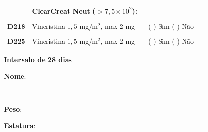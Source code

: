\documentclass[11pt,a4paper,oldfontcommands]{memoir}
\def\entrywithlabel[#1]#2{\parbox{#1}{{\small #2:} \hrulefill}}
\begin{document}
\begin{center}
\begin{table}[H]
\begin{tabular}{p{1cm}p{6cm}|p{1cm}|p{3cm}|p{2.5cm}}
    \cline{2-5}
    \multicolumn{1}{c|}{\multirow{2}{*}{{}}}&\multicolumn{2}{l|}{ClearCreat Neut (\(>7,5\times10^2\)):}&{}&{}\\
    \hline
    \\
    \hline
    \multicolumn{1}{c|}{\multirow{1}{*}{\textbf{D218}}}&{Vincristina \(1,5\) mg/m\(^2\), max \(2\) mg}&&{(  ) Sim (  ) Não}&\\
    \hline
    \\
    \hline
    \multicolumn{1}{c|}{\multirow{1}{*}{\textbf{D225}}}&{Vincristina \(1,5\) mg/m\(^2\), max \(2\) mg}&&{(  ) Sim (  ) Não}&\\
    \hline
    \end{tabular}
    \end{table}
    \textbf{Intervalo de 28 dias}

    \clearpage
    \noindent
\entrywithlabel[1\hsize]{\textbf{Nome}}\hfill
\\[0.3cm]
\entrywithlabel[.45\hsize]{\textbf{Peso}}\hfill  \entrywithlabel[.45\hsize]{\textbf{Estatura}}


\end{center}
\end{document}
